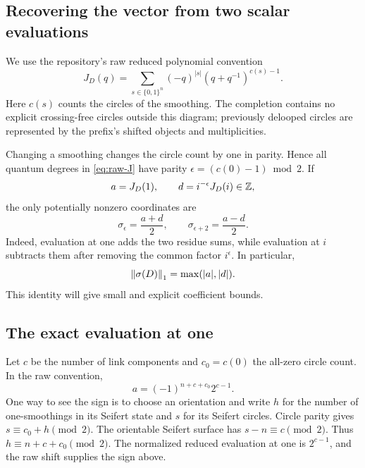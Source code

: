 \subsection{Recovering the vector from two scalar evaluations}

We use the repository's raw reduced polynomial convention
\begin{equation}
 J_D(q)=\sum_{s\in\{0,1\}^n}(-q)^{|s|}
                 (q+q^{-1})^{c(s)-1}.
 \label{eq:raw-J}
\end{equation}
Here $c(s)$ counts the circles of the smoothing. The completion contains no
explicit crossing-free circles outside this diagram; previously delooped
circles are represented by the prefix's shifted objects and multiplicities.

Changing a smoothing changes the circle count by one in parity. Hence all
quantum degrees in \cref{eq:raw-J} have parity
$\epsilon=(c(0)-1)\bmod2$. If
\[
 a=J_D(1),\qquad d=i^{-\epsilon}J_D(i)\in\mathbb Z,
\]
the only potentially nonzero coordinates are
\begin{equation}
 \sigma_\epsilon=\frac{a+d}{2},\qquad
 \sigma_{\epsilon+2}=\frac{a-d}{2}.
 \label{eq:two-values}
\end{equation}
Indeed, evaluation at one adds the two residue sums, while evaluation at $i$
subtracts them after removing the common factor $i^\epsilon$. In particular,
\begin{equation}
                     \left\lVert \sigma(D)\right\rVert_1=\max(|a|,|d|).
 \label{eq:maxnorm}
\end{equation}
This identity will give small and explicit coefficient bounds.

\subsection{The exact evaluation at one}

Let $c$ be the number of link components and $c_0=c(0)$ the all-zero circle
count. In the raw convention,
\begin{equation}
                  a=(-1)^{n+c+c_0}2^{c-1}.
 \label{eq:euler-sign}
\end{equation}
One way to see the sign is to choose an orientation and write $h$ for the
number of one-smoothings in its Seifert state and $s$ for its Seifert circles.
Circle parity gives $s\equiv c_0+h\pmod2$. The orientable Seifert surface
has $s-n\equiv c\pmod2$. Thus $h\equiv n+c+c_0\pmod2$.
The normalized reduced evaluation at one is $2^{c-1}$, and the raw shift
supplies the sign above.

